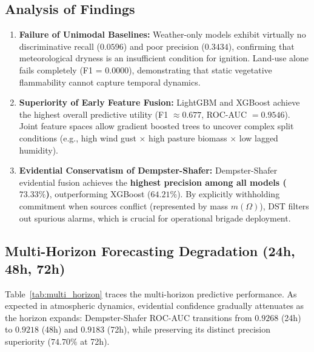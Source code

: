 \documentclass[runningheads]{llncs}
\begin{document}
\subsection{Analysis of Findings}
\begin{enumerate}
    \item \textbf{Failure of Unimodal Baselines:} Weather-only models exhibit virtually no discriminative recall ($0.0596$) and poor precision ($0.3434$), confirming that meteorological dryness is an insufficient condition for ignition. Land-use alone fails completely (F1 = $0.0000$), demonstrating that static vegetative flammability cannot capture temporal dynamics.
    \item \textbf{Superiority of Early Feature Fusion:} LightGBM and XGBoost achieve the highest overall predictive utility (F1 $\approx 0.677$, ROC-AUC $= 0.9546$). Joint feature spaces allow gradient boosted trees to uncover complex split conditions (e.g., high wind gust $\times$ high pasture biomass $\times$ low lagged humidity).
    \item \textbf{Evidential Conservatism of Dempster-Shafer:} Dempster-Shafer evidential fusion achieves the \textbf{highest precision among all models ($73.33\%$)}, outperforming XGBoost ($64.21\%$). By explicitly withholding commitment when sources conflict (represented by mass $m(\Omega)$), DST filters out spurious alarms, which is crucial for operational brigade deployment.
\end{enumerate}

\subsection{Multi-Horizon Forecasting Degradation (24h, 48h, 72h)}
Table~\ref{tab:multi_horizon} traces the multi-horizon predictive performance. As expected in atmospheric dynamics, evidential confidence gradually attenuates as the horizon expands: Dempster-Shafer ROC-AUC transitions from $0.9268$ (24h) to $0.9218$ (48h) and $0.9183$ (72h), while preserving its distinct precision superiority ($74.70\%$ at 72h).
\end{document}
